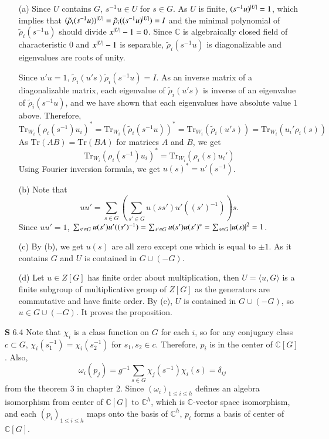 \documentclass[a4paper, 12pt]{article}
\theoremstyle{Mydefinition}
\theoremstyle{Mytheorem}
\begin{document}
\begin{enumerate}
    \item[(a)] Since $U$ contains $G$, $s^{-1}u\in U$ for $s\in G$. As $U$ is finite, $(s^{-1}u)^{\abs{U}} = 1$, which implies that $(\tilde{\rho}_i(s^{-1}u))^{\abs{U}} = \tilde{\rho}_i((s^{-1}u)^{\abs{U}}) = I$ and the minimal polynomial of $\tilde{\rho}_i(s^{-1}u)$ should divide $x^{\abs{U}}-1 = 0$. Since $\mathbb{C}$ is algebraically closed field of characteristic $0$ and $x^{\abs{U}}-1$ is separable, $\tilde{\rho}_i(s^{-1}u)$ is diagonalizable and eigenvalues are roots of unity.

    Since $u'u = 1$, $\tilde{\rho}_i(u's)\tilde{\rho}_i(s^{-1}u) = I$. As an inverse matrix of a diagonalizable matrix, each eigenvalue of $\tilde{\rho}_i(u's)$ is inverse of an eigenvalue of $\tilde{\rho}_i(s^{-1}u)$, and we have shown that each eigenvalues have absolute value $1$ above. Therefore,
    \begin{equation}
        \mathrm{Tr}_{W_i}(\rho_i(s^{-1})u_i)^* = \mathrm{Tr}_{W_i}(\tilde{\rho}_i(s^{-1}u))^* = \mathrm{Tr}_{W_i}(\tilde{\rho}_i(u's)) = \mathrm{Tr}_{W_i}(u_i'\rho_i(s))
    \end{equation}
    As $\mathrm{Tr}(AB) = \mathrm{Tr}(BA)$ for matrices $A$ and $B$, we get
    \begin{equation}
        \mathrm{Tr}_{W_i}(\rho_i(s^{-1})u_i)^* = \mathrm{Tr}_{W_i}(\rho_i(s)u_i')
    \end{equation}
    Using Fourier inversion formula, we get $u(s)^* = u'(s^{-1})$.
    \item[(b)] Note that
    \begin{equation}
        uu' = \sum_{s\in G}\left(\sum_{s'\in G}u(ss')u'((s')^{-1})\right)s.
    \end{equation}
    Since $uu' = 1$, $\sum_{s'\in G}u(s')u'((s')^{-1}) = \sum_{s'\in G}u(s')u(s')^*  = \sum_{s\in G}\abs{u(s)}^2= 1$.
    \item[(c)] By (b), we get $u(s)$ are all zero except one which is equal to $\pm 1$. As it contains $G$ and $U$ is contained in $G\cup (-G)$.
    \item[(d)] Let $u\in Z[G]$ has finite order about multiplication, then $U = \langle u, G\rangle$ is a finite subgroup of multiplicative group of $Z[G]$ as the generators are commutative and have finite order. By (c), $U$ is contained in $G\cup (-G)$, so $u\in G\cup (-G)$. It proves the proposition.
\end{enumerate}

\noindent \textbf{S} 6.4
Note that $\chi_i$ is a class function on $G$ for each $i$, so for any conjugacy class $c\subset G$, $\chi_i(s^{-1}_1)=\chi_i(s^{-1}_2)$ for $s_1,s_2\in c$. Therefore, $p_i$ is in the center of $\mathbb{C}[G]$. Also,
\begin{equation}
    \omega_i(p_j) = g^{-1}\sum_{s\in G}\chi_j(s^{-1})\chi_i(s) = \delta_{ij}
\end{equation}
from the theorem 3 in chapter 2. Since $(\omega_i)_{1\leq i\leq h}$ defines an algebra isomorphism from center of $\mathbb{C}[G]$ to $\mathbb{C}^h$, which is $\mathbb{C}$-vector space isomorphism, and each $(p_i)_{1\leq i\leq h}$ maps onto the basis of $\mathbb{C}^h$, $p_i$ forms a basis of center of $\mathbb{C}[G]$.
\end{document}
